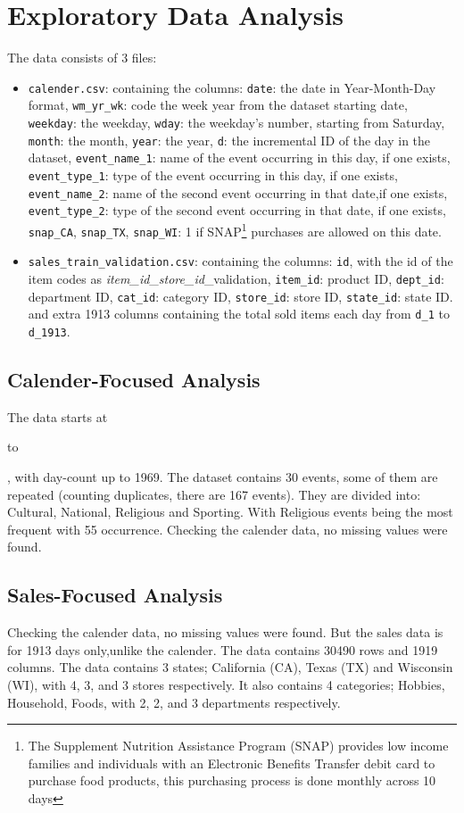 \documentclass[12pt]{article}
\begin{document}
\section{Exploratory Data Analysis}
The data consists of 3 files: \begin{itemize}
    \item \texttt{calender.csv}: containing the columns: \texttt{date}: the date in Year-Month-Day format, \texttt{wm\_yr\_wk}: code the week year from the dataset starting date, \texttt{weekday}: the weekday, \texttt{wday}: the weekday's number, starting from Saturday, \texttt{month}: the month, \texttt{year}: the year, \texttt{d}: the incremental ID of the day in the dataset, \texttt{event\_name\_1}: name of the event occurring in this day, if one exists, \texttt{event\_type\_1}: type of the event occurring in this day, if one exists, \texttt{event\_name\_2}: name of the second event occurring in that date,if one exists, \texttt{event\_type\_2}: type of the second event occurring in that date, if one exists, \texttt{snap\_CA}, \texttt{snap\_TX}, \texttt{snap\_WI}: 1 if SNAP\footnote{The Supplement Nutrition 
    Assistance Program (SNAP) provides low income families and individuals with an Electronic Benefits Transfer 
    debit card to purchase food products, this purchasing process is done monthly across 10 days} purchases are allowed on this date.
    \item \texttt{sales\_train\_validation.csv}: containing the columns: \texttt{id}, with the id of the item codes as \textit{item\_id}\_\textit{store\_id}\_validation, \texttt{item\_id}: product ID, \texttt{dept\_id}: department ID,
    \texttt{cat\_id}: category ID, \texttt{store\_id}: store ID, \texttt{state\_id}: state ID. and extra 1913 columns containing the total sold items each day from \texttt{d\_1} to \texttt{d\_1913}.
\end{itemize}
\subsection{Calender-Focused Analysis}
The data starts at \date{January 29, 2011} to \date{June 19, 2016}, with day-count up to 1969. The dataset contains 30 events, some of them are repeated (counting duplicates, there are 167 events). They are divided into: Cultural, National, Religious and Sporting. With Religious events being the most frequent with 55 occurrence. Checking the calender data, no missing values were found.
\subsection{Sales-Focused Analysis}
Checking the calender data, no missing values were found. But the sales data is for 1913 days only,unlike the calender. The data contains 30490 rows and 1919 columns. The data contains 3 states; California (CA), Texas (TX) and Wisconsin (WI), with 4, 3, and 3 stores respectively. It also contains 4 categories; Hobbies, Household, Foods, with 2, 2, and 3 departments respectively.
\end{document}
